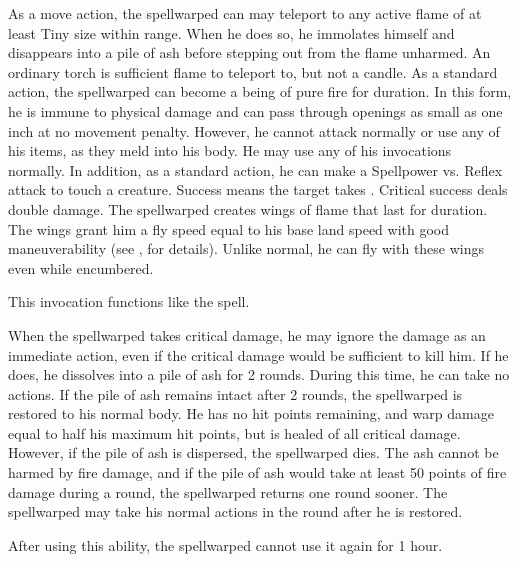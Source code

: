             As a move action, the spellwarped can may teleport to any active flame of at least Tiny size within \rngmed range.
            When he does so, he immolates himself and disappears into a pile of ash before stepping out from the flame unharmed.
            An ordinary torch is sufficient flame to teleport to, but not a candle.
            As a standard action, the spellwarped can become a being of pure fire for \durshort duration.
            In this form, he is immune to physical damage and can pass through openings as small as one inch at no movement penalty.
            However, he cannot attack normally or use any of his items, as they meld into his body.
            He may use any of his invocations normally.
            In addition, as a standard action, he can make a Spellpower vs. Reflex attack to touch a creature.
            Success means the target takes .
            Critical success deals double damage.
            The spellwarped creates wings of flame that last for \durshort duration.
            The wings grant him a fly speed equal to his base land speed with good maneuverability (see , for details).
            Unlike normal, he can fly with these wings even while encumbered.

            This invocation functions like the  spell.

            When the spellwarped takes critical damage, he may ignore the damage as an immediate action, even if the critical damage would be sufficient to kill him.
            If he does, he dissolves into a pile of ash for 2 rounds.
            During this time, he can take no actions.
            If the pile of ash remains intact after 2 rounds, the spellwarped is restored to his normal body.
            He has no hit points remaining, and warp damage equal to half his maximum hit points, but is healed of all critical damage.
            However, if the pile of ash is dispersed, the spellwarped dies.
            The ash cannot be harmed by fire damage, and if the pile of ash would take at least 50 points of fire damage during a round, the spellwarped returns one round sooner.
            The spellwarped may take his normal actions in the round after he is restored.
            \par After using this ability, the spellwarped cannot use it again for 1 hour.

